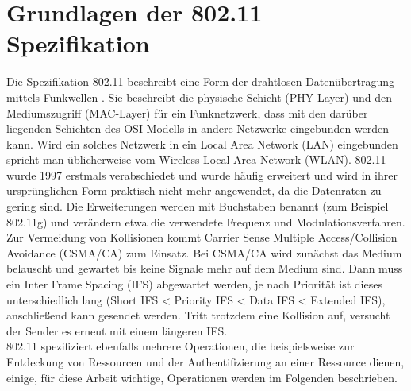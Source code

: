 \section{Grundlagen der 802.11 Spezifikation}
\label{ch:phase1:sec:grundlagen}
Die Spezifikation 802.11 beschreibt eine Form der drahtlosen Datenübertragung mittels Funkwellen \cite{ieee2012macphy}.
Sie beschreibt die physische Schicht (PHY-Layer) und den Mediumszugriff (MAC-Layer) für ein Funknetzwerk, dass mit den darüber liegenden Schichten des OSI-Modells in andere Netzwerke eingebunden werden kann.
Wird ein solches Netzwerk in ein Local Area Network (LAN) eingebunden spricht man üblicherweise vom Wireless Local Area Network (WLAN).
802.11 wurde 1997 erstmals verabschiedet und wurde häufig erweitert und wird in ihrer ursprünglichen Form praktisch nicht mehr angewendet, da die Datenraten zu gering sind.
Die Erweiterungen werden mit Buchstaben benannt (zum Beispiel 802.11g) und verändern etwa die verwendete Frequenz und Modulationsverfahren.\\
Zur Vermeidung von Kollisionen kommt Carrier Sense Multiple Access/Collision Avoidance (CSMA/CA) zum Einsatz.
Bei CSMA/CA wird zunächst das Medium belauscht und gewartet bis keine Signale mehr auf dem Medium sind. 
Dann muss ein Inter Frame Spacing (IFS) abgewartet werden, je nach Priorität ist dieses unterschiedlich lang (Short IFS < Priority IFS < Data IFS < Extended IFS), anschließend kann gesendet werden.
Tritt trotzdem eine Kollision auf, versucht der Sender es erneut mit einem längeren IFS.\\
802.11 spezifiziert ebenfalls mehrere Operationen, die beispielsweise zur Entdeckung von Ressourcen und der Authentifizierung an einer Ressource dienen, einige, für diese Arbeit wichtige, Operationen werden im Folgenden beschrieben.

